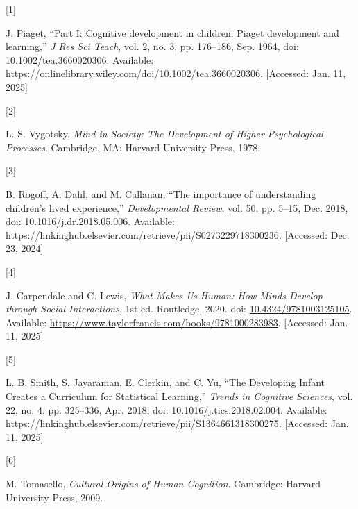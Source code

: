 \documentclass[
  man,floatsintext]{apa6}
\newlength{\cslhangindent}
\newlength{\csllabelwidth}
\newenvironment{CSLReferences}[2] %
 {\begin{list}{}{%
  \setlength{\itemindent}{0pt}
  \setlength{\leftmargin}{0pt}
  \setlength{\parsep}{0pt}
  \ifodd #1
   \setlength{\leftmargin}{\cslhangindent}
   \setlength{\itemindent}{-1\cslhangindent}
  \fi
  \setlength{\itemsep}{#2\baselineskip}}}
 {\end{list}}
\newcommand{\CSLLeftMargin}[1]{\parbox[t]{\csllabelwidth}{\strut#1\strut}}
\newcommand{\CSLRightInline}[1]{\parbox[t]{\linewidth - \csllabelwidth}{\strut#1\strut}}
\begin{document}
\label{refs}
\begin{CSLReferences}{0}{0}
\CSLLeftMargin{{[}1{]} }%
\CSLRightInline{J. Piaget, {``Part {I}: {Cognitive} development in children: {Piaget} development and learning,''} \emph{J Res Sci Teach}, vol. 2, no. 3, pp. 176--186, Sep. 1964, doi: \href{https://doi.org/10.1002/tea.3660020306}{10.1002/tea.3660020306}. Available: \url{https://onlinelibrary.wiley.com/doi/10.1002/tea.3660020306}. {[}Accessed: Jan. 11, 2025{]}}

\CSLLeftMargin{{[}2{]} }%
\CSLRightInline{L. S. Vygotsky, \emph{Mind in {Society}: {The Development} of {Higher Psychological Processes}}. Cambridge, MA: Harvard University Press, 1978.}

\CSLLeftMargin{{[}3{]} }%
\CSLRightInline{B. Rogoff, A. Dahl, and M. Callanan, {``The importance of understanding children's lived experience,''} \emph{Developmental Review}, vol. 50, pp. 5--15, Dec. 2018, doi: \href{https://doi.org/10.1016/j.dr.2018.05.006}{10.1016/j.dr.2018.05.006}. Available: \url{https://linkinghub.elsevier.com/retrieve/pii/S0273229718300236}. {[}Accessed: Dec. 23, 2024{]}}

\CSLLeftMargin{{[}4{]} }%
\CSLRightInline{J. Carpendale and C. Lewis, \emph{What {Makes Us Human}: {How Minds Develop} through {Social Interactions}}, 1st ed. Routledge, 2020. doi: \href{https://doi.org/10.4324/9781003125105}{10.4324/9781003125105}. Available: \url{https://www.taylorfrancis.com/books/9781000283983}. {[}Accessed: Jan. 11, 2025{]}}

\CSLLeftMargin{{[}5{]} }%
\CSLRightInline{L. B. Smith, S. Jayaraman, E. Clerkin, and C. Yu, {``The {Developing Infant Creates} a {Curriculum} for {Statistical Learning},''} \emph{Trends in Cognitive Sciences}, vol. 22, no. 4, pp. 325--336, Apr. 2018, doi: \href{https://doi.org/10.1016/j.tics.2018.02.004}{10.1016/j.tics.2018.02.004}. Available: \url{https://linkinghub.elsevier.com/retrieve/pii/S1364661318300275}. {[}Accessed: Jan. 11, 2025{]}}

\CSLLeftMargin{{[}6{]} }%
\CSLRightInline{M. Tomasello, \emph{Cultural {Origins} of {Human Cognition}}. Cambridge: Harvard University Press, 2009.}


\end{CSLReferences}
\end{document}
